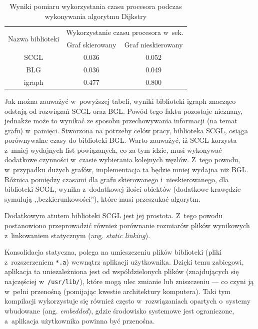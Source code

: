 \documentclass[a4paper,12pt,polish,oneside,openright]{thesis}
\newcommand\code[1]{\lstinline[style=line]{#1}}
\begin{document}
\begin{table}[htb]
\caption{Wyniki pomiaru wykorzystania czasu procesora podczas wykonywania algorytmu Dijkstry}
\label{tab:dijkstra}
\centering
\begin{tabular}{ | c | c | c | }
	\hline
	\multirow{2}{*}{Nazwa biblioteki } & \multicolumn{2}{|c|}{Wykorzystanie czasu procesora w~sek.} \\
	\cline{2-3}
		& Graf skierowany & Graf nieskierowany \\
	\hline \hline
	SCGL    & 0.036 & 0.052 \\ \hline
	BLG     & 0.036 & 0.049 \\ \hline
	igraph  & 0.477 & 0.800 \\ \hline
\end{tabular}
\end{table}
Jak można zauważyć w~powyższej tabeli, wyniki biblioteki igraph znacząco odstają od rozwiązań SCGL oraz BGL.
Powód tego faktu pozostaje nieznany, jednakże może to wynikać ze sposobu przechowywania informacji (na temat grafu) w~pamięci.
Stworzona na potrzeby celów pracy, biblioteka SCGL, osiąga porównywalne czasy do biblioteki BGL.
Warto zauważyć, iż SCGL korzysta z~mniej wydajnych list powiązanych, co za tym idzie, musi wykonywać dodatkowe czynności w~czasie wybierania kolejnych węzłów.
Z~tego powodu, w~przypadku dużych grafów, implementacja ta będzie mniej wydajna niż BGL.
Różnica pomiędzy czasami dla grafu skierowanego i~nieskierowanego, dla biblioteki SCGL, wynika z~dodatkowej ilości obiektów (dodatkowe krawędzie symulują ,,bezkierunkowości''), które musi przeszukać algorytm.

Dodatkowym atutem biblioteki SCGL jest jej prostota.
Z~tego powodu postanowiono przeprowadzić również porównanie rozmiarów plików wynikowych z~linkowaniem statycznym (ang. \emph{static linking}).

Konsolidacja statyczna, polega na umieszczeniu plików biblioteki (pliki z~rozszerzeniem \code{*.a}) wewnątrz aplikacji użytkownika.
Dzięki temu zabiegowi, aplikacja ta uniezależniona jest od współdzielonych plików (znajdujących się najczęściej w~\code{/usr/lib/}), które mogą ulec zmianie lub zniszczeniu --- co czyni ją w~pełni przenośną (pomijając kwestie architektury komputera).
Taki tym kompilacji wykorzystuje się również często w~rozwiązaniach opartych o~systemy wbudowane (ang. \emph{embedded}), gdzie środowisko systemowe jest ograniczone, a~aplikacja użytkownika powinna być przenośna.
\end{document}
